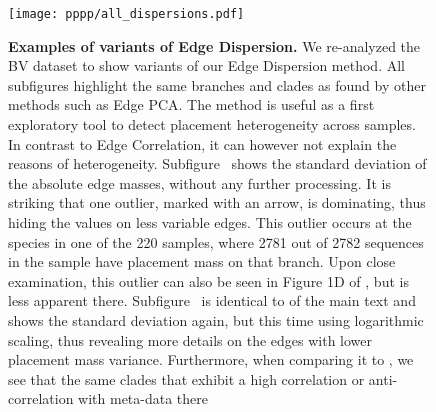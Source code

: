 \begin{figure}[!ht]
    \centering
    \texttt{[image: pppp/all\_dispersions.pdf]}
    \begin{subfigure}{0pt}
        \label{fig:all_dispersions:sub:em_var}
    \end{subfigure}
    \begin{subfigure}{0pt}
        \label{fig:all_dispersions:sub:em_varc}
    \end{subfigure}
    \begin{subfigure}{0pt}
        \label{fig:all_dispersions:sub:em_iod}
    \end{subfigure}
    \begin{subfigure}{0pt}
        \label{fig:all_dispersions:sub:ei_var}
    \end{subfigure}
    \caption[Examples of variants of Edge Dispersion]{
        \textbf{Examples of variants of Edge Dispersion.}
        We re-analyzed the \ac{BV} dataset to show variants of our Edge Dispersion method.
        All subfigures highlight the same branches and clades as found by other methods such as Edge PCA.
        The method is useful as a first exploratory tool to detect placement heterogeneity across samples.
        In contrast to Edge Correlation, it can however not explain the reasons of heterogeneity.
        Subfigure~
        shows the standard deviation of the absolute edge masses, without any further processing.
        It is striking that one outlier, marked with an arrow, is dominating,
        thus hiding the values on less variable edges.
        This outlier occurs at the species  in one of the \num{220} samples,
        where \num{2 781} out of \num{2 782} sequences in the sample have placement mass on that branch.
        Upon close examination, this outlier can also be seen in Figure 1D of \cite{Srinivasan2012},
        but is less apparent there.
        Subfigure~
        is identical to  of the main text
        and shows the standard deviation again, but this time using logarithmic scaling,
        thus revealing more details on the edges with lower placement mass variance.
        Furthermore, when comparing it to ,
        we see that the same clades that exhibit a high correlation or anti-correlation with meta-data there
}
\end{figure}
